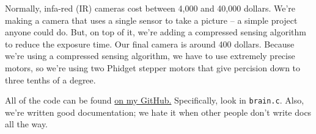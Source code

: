 \documentclass{article}
\newcommand{\github}{https://github.com/scottsievert/IRcamera/tree/master/temp.rpi/IRcamera}
\begin{document}
    Normally, infa-red (IR) cameras cost between 4,000 and 40,000 dollars. We're making a camera that uses a single sensor to take a picture -- a simple project anyone could do. But, on top of it, we're adding a compressed sensing algorithm to reduce the exposure time. Our final camera is around 400 dollars. Because we're using a compressed sensing algorithm, we have to use extremely precise motors, so we're using two Phidget stepper motors that give percision down to three tenths of a degree.

    All of the code can be found \href{\github}{on my GitHub.} Specifically, look in \texttt{brain.c}. Also, we're written good documentation; we hate it when other people don't write docs all the way.

\end{document}
